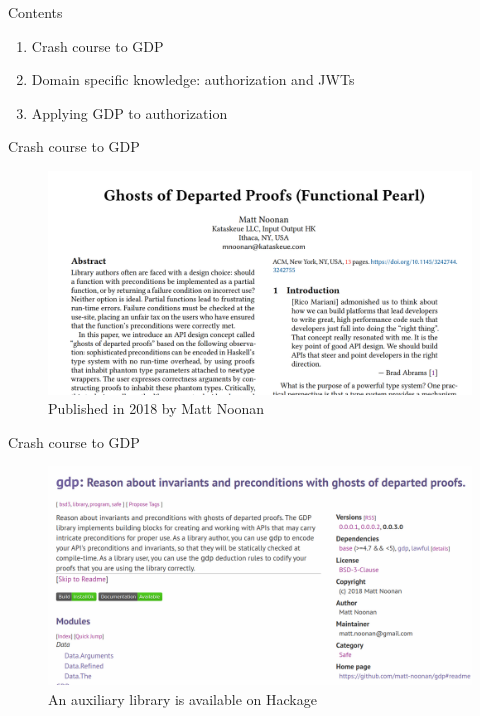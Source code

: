 \documentclass[
  9pt,
  ignorenonframetext,
]{beamer}
\providecommand{\tightlist}{%
  \setlength{\itemsep}{0pt}\setlength{\parskip}{0pt}}
\begin{document}
\begin{frame}{Contents}
\protect\hypertarget{contents}{}
\begin{enumerate}
\tightlist
\item
  Crash course to GDP
\item
  Domain specific knowledge: authorization and JWTs
\item
  Applying GDP to authorization
\end{enumerate}







\end{frame}

\begin{frame}{Crash course to GDP}
\protect\hypertarget{crash-course-to-gdp}{}
\begin{figure}
\centering
\includegraphics[width=\textwidth,height=0.8\textheight]{resources/gdp.png}
\caption{Published in 2018 by Matt Noonan}
\end{figure}






\end{frame}

\begin{frame}{Crash course to GDP}
\protect\hypertarget{crash-course-to-gdp-1}{}
\begin{figure}
\centering
\includegraphics[width=\textwidth,height=0.8\textheight]{resources/gdp-library.png}
\caption{An auxiliary library is available on Hackage}
\end{figure}



\end{frame}
\end{document}
